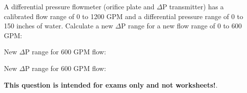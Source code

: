 

A differential pressure flowmeter (orifice plate and $\Delta$P transmitter) has a calibrated flow range of 0 to 1200 GPM and a differential pressure range of 0 to 150 inches of water.  Calculate a new $\Delta$P range for a new flow range of 0 to 600 GPM:

\vskip 10pt

New $\Delta$P range for 600 GPM flow: \underbar{\hskip 50pt}







New $\Delta$P range for 600 GPM flow: 







{\bf This question is intended for exams only and not worksheets!}.



